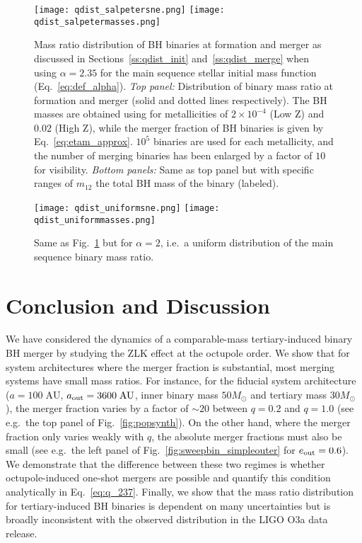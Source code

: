 \documentclass[
        fleqn,
        usenatbib,
    ]{mnras}
\begin{document}
\begin{figure}
    \centering
    \texttt{[image: qdist\_salpetersne.png]}
    \texttt{[image: qdist\_salpetermasses.png]}
    \caption{Mass ratio distribution of BH binaries at formation and merger as
    discussed in Sections~\ref{ss:qdist_init} and~\ref{ss:qdist_merge} when
    using $\alpha = 2.35$ for the main sequence stellar initial mass function
    (Eq.~\ref{eq:def_alpha}). \emph{Top panel:} Distribution of binary mass
    ratio at formation and merger (solid and dotted lines respectively). The BH
    masses are obtained using \citet{spera2017very} for metallicities of $2
    \times 10^{-4}$ (Low Z) and $0.02$ (High Z), while the merger fraction of BH
    binaries is given by Eq.~\eqref{eq:etam_approx}. $10^5$ binaries are used
    for each metallicity, and the number of merging binaries has been enlarged
    by a factor of $10$ for visibility. \emph{Bottom panels:} Same as top panel
    but with specific ranges of $m_{12}$ the total BH mass of the binary
    (labeled). }\label{fig:qdist_salpeter}
\end{figure}
\begin{figure}
    \centering
    \texttt{[image: qdist\_uniformsne.png]}
    \texttt{[image: qdist\_uniformmasses.png]}
    \caption{Same as Fig.~\ref{fig:qdist_salpeter} but for $\alpha = 2$, i.e.\ a
    uniform distribution of the main sequence binary mass
    ratio.}\label{fig:qdist_uniform}
\end{figure}

\section{Conclusion and Discussion}\label{s:conclusion}

We have considered the dynamics of a comparable-mass tertiary-induced binary BH
merger by studying the ZLK effect at the octupole order. We show that for system
architectures where the merger fraction is substantial, most merging systems
have small mass ratios. For instance, for the fiducial system architecture ($a =
100\;\mathrm{AU}$, $a_{\rm out} = 3600\;\mathrm{AU}$, inner binary mass
$50M_{\odot}$ and tertiary mass $30M_{\odot}$), the merger fraction varies by a
factor of $\sim 20$ between $q = 0.2$ and $q = 1.0$ (see e.g.\ the top panel of
Fig.~\ref{fig:popsynth}). On the other hand, where the merger fraction only
varies weakly with $q$, the absolute merger fractions must also be small (see
e.g.\ the left panel of Fig.~\ref{fig:sweepbin_simpleouter} for $e_{\rm out} =
0.6$). We demonstrate that the difference between these two regimes is whether
octupole-induced one-shot mergers are possible and quantify this condition
analytically in Eq.~\eqref{eq:q_237}. Finally, we show that the mass ratio
distribution for tertiary-induced BH binaries is dependent on many uncertainties
but is broadly inconsistent with the observed distribution in the LIGO O3a data
release.
\end{document}
